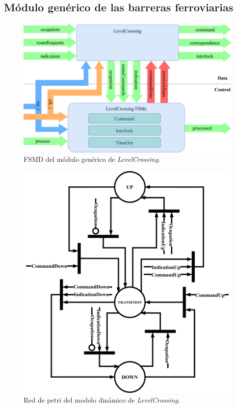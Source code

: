 \subsection{Módulo genérico de las barreras ferroviarias}

\lipsum[1]

\begin{figure}[H]
	\centering
	\includegraphics[width=1\textwidth]{Figuras/LCB_module}
	\centering\caption{FSMD del módulo genérico de \textit{LevelCrossing}.}
	\label{fig:LCB_module}
\end{figure}

\lipsum[1]

\begin{figure}[H]
	\centering
	\includegraphics[width=1\textwidth]{Figuras/LCB_petri}
	\centering\caption{Red de petri del modelo dinámico de \textit{LevelCrossing}.}
	\label{fig:LCB_module}
\end{figure}

\lipsum[1]